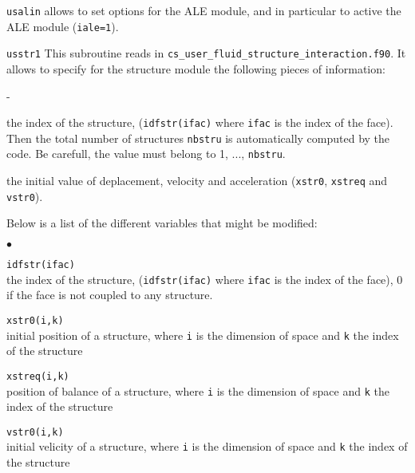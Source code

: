 {{\texttt{usalin} allows to set options for the ALE module, and in
particular to active the ALE module (\texttt{iale=1}).


\texttt{usstr1} This subroutine reads in \texttt{cs\_user\_fluid\_structure\_interaction.f90}. It allows to specify for the structure module the
following pieces of information:
\begin{list}{-}{}
  \item the index of the structure, (\texttt{idfstr(ifac)} where \texttt{ifac} is the index of the face). Then the total number of structures \texttt{nbstru} is automatically computed by the code. Be carefull, the value must belong to 1, ..., \texttt{nbstru}.
  \item the initial value of deplacement, velocity and acceleration
    (\texttt{xstr0}, \texttt{xstreq} and \texttt{vstr0}).
\end{list}

Below is a list of the different variables that might be modified:

\begin{list}{$\bullet$}{}

\item{\texttt{idfstr(ifac)}} \\
{the index of the structure, (\texttt{idfstr(ifac)} where \texttt{ifac} is the index of the face), 0 if the face is not coupled to any structure.}

\item{\texttt{xstr0(i,k)}} \\
{initial position of a structure, where \texttt{i} is the dimension of space
and \texttt{k} the index of the structure}

\item{\texttt{xstreq(i,k)}} \\
{position of balance of a structure, where \texttt{i} is the dimension of space
and \texttt{k} the index of the structure}

\item{\texttt{vstr0(i,k)}} \\
{initial velicity of a structure, where \texttt{i} is the dimension of space
and \texttt{k} the index of the structure }
\end{list}

}}
